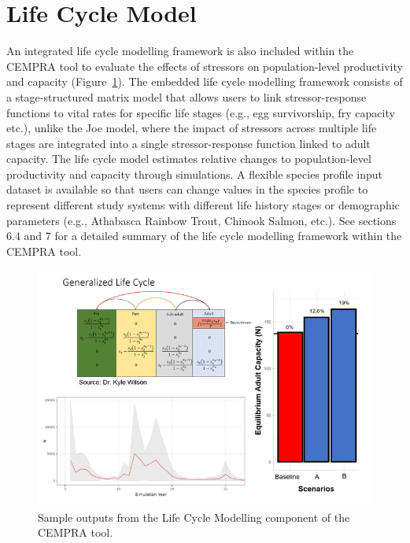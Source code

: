 \documentclass[
  letterpaper,
  DIV=11,
  numbers=noendperiod]{scrreprt}
\begin{document}
\hypertarget{life-cycle-model}{%
\section{Life Cycle Model}\label{life-cycle-model}}

An integrated life cycle modelling framework is also included within the
CEMPRA tool to evaluate the effects of stressors on population-level
productivity and capacity (Figure~\ref{fig-figure5}). The embedded life
cycle modelling framework consists of a stage-structured matrix model
that allows users to link stressor-response functions to vital rates for
specific life stages (e.g., egg survivorship, fry capacity etc.), unlike
the Joe model, where the impact of stressors across multiple life stages
are integrated into a single stressor-response function linked to adult
capacity. The life cycle model estimates relative changes to
population-level productivity and capacity through simulations. A
flexible species profile input dataset is available so that users can
change values in the species profile to represent different study
systems with different life history stages or demographic parameters
(e.g., Athabasca Rainbow Trout, Chinook Salmon, etc.). See sections 6.4
and 7 for a detailed summary of the life cycle modelling framework
within the CEMPRA tool.

\begin{figure}

{\centering \includegraphics{images/image009.png}

}

\caption{\label{fig-figure5}Sample outputs from the Life Cycle Modelling
component of the CEMPRA tool.}

\end{figure}
\end{document}
